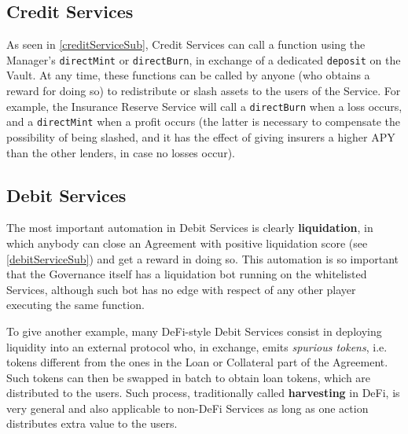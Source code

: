 \documentclass[a4paper,10 pt]{article}
\theoremstyle{definition}
\begin{document}
\subsection{Credit Services}\label{automationCreditSubSec}
As seen in \ref{creditServiceSub}, Credit Services can call a function using the Manager's \verb|directMint| or \verb|directBurn|, in exchange of a dedicated \verb|deposit| on the Vault. At any time, these functions can be called by anyone (who obtains a reward for doing so) to redistribute or slash assets to the users of the Service.
For example, the Insurance Reserve Service will call a \verb|directBurn| when a loss occurs, and a \verb|directMint| when a profit occurs (the latter is necessary to compensate the possibility of being slashed, and it has the effect of giving insurers a higher APY than the other lenders, in case no losses occur).

\subsection{Debit Services}\label{automationDebitSubSec}
The most important automation in Debit Services is clearly {\bf liquidation}, in which anybody can close an Agreement with positive liquidation score (see \ref{debitServiceSub}) and get a reward in doing so. This automation is so important that the Governance itself has a liquidation bot running on the whitelisted Services, although such bot has no edge with respect of any other player executing the same function. 

To give another example, many DeFi-style Debit Services consist in deploying liquidity into an external protocol who, in exchange, emits {\it spurious tokens}, i.e. tokens different from the ones in the Loan or Collateral part of the Agreement. Such tokens can then be swapped in batch to obtain loan tokens, which are distributed to the users. Such process, traditionally called {\bf harvesting} in DeFi, is very general and also applicable to non-DeFi Services as long as one action distributes extra value to the users. 
\end{document}
